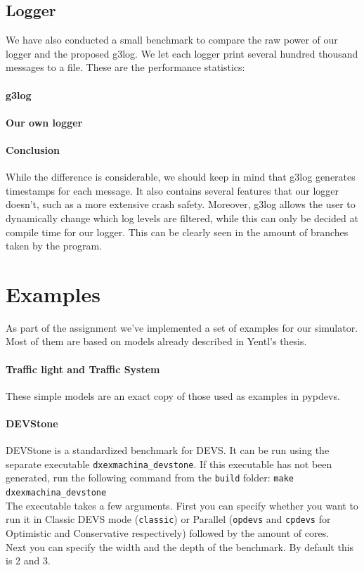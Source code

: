 \documentclass[8pt,a4paper]{report}
\begin{document}
\section{Logger}
We have also conducted a small benchmark to compare the raw power of our logger and the proposed g3log.
We let each logger print several hundred thousand messages to a file. These are the performance statistics:
\subsubsection{g3log}

\subsubsection{Our own logger}

\subsubsection{Conclusion}
While the difference is considerable, we should keep in mind that g3log generates timestamps for each message. It also contains several features that our logger doesn't, such as a more extensive crash safety. Moreover, g3log allows the user to dynamically change which log levels are filtered, while this can only be decided at compile time for our logger. This can be clearly seen in the amount of branches taken by the program.

\chapter{Examples}
As part of the assignment we've implemented a set of examples for our simulator. Most of them are based on models already described in Yentl's thesis. 

\subsubsection{Traffic light and Traffic System}
These simple models are an exact copy of those used as examples in pypdevs.

\subsubsection{DEVStone}
DEVStone is a standardized benchmark for DEVS. It can be run using the separate executable \texttt{dxexmachina\_devstone}. If this executable has not been generated, run the following command from the \texttt{build} folder: \texttt{make dxexmachina\_devstone}\\
The executable takes a few arguments. First you can specify whether you want to run it in Classic DEVS mode (\texttt{classic}) or Parallel (\texttt{opdevs} and \texttt{cpdevs} for Optimistic and Conservative respectively) followed by the amount of cores.\\
Next you can specify the width and the depth of the benchmark. By default this is 2 and 3.
\end{document}
